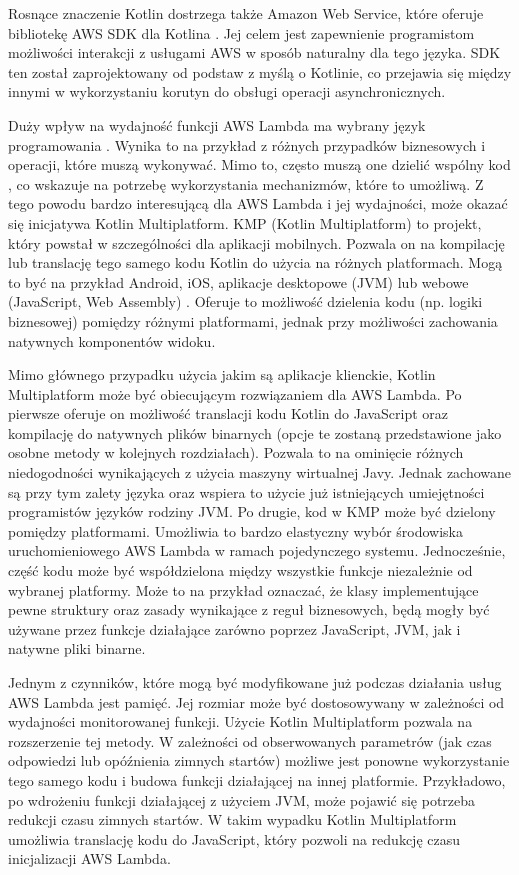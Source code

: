 Rosnące znaczenie Kotlin dostrzega także Amazon Web Service, które oferuje bibliotekę AWS SDK dla Kotlina \cite{awsSDKForKotlinDeveloperGuide}.
Jej celem jest zapewnienie programistom możliwości interakcji z usługami AWS w sposób naturalny dla tego języka.
SDK ten został zaprojektowany od podstaw z myślą o Kotlinie, co przejawia się między innymi w wykorzystaniu korutyn do obsługi operacji asynchronicznych.

Duży wpływ na wydajność funkcji AWS Lambda ma wybrany język programowania \cite{8605773}\cite{Cordingly2020704}.
Wynika to na przykład z różnych przypadków biznesowych i operacji, które muszą wykonywać.
Mimo to, często muszą one dzielić wspólny kod \cite{8116416}, co wskazuje na potrzebę wykorzystania mechanizmów, które to umożliwą.
Z tego powodu bardzo interesującą dla AWS Lambda i jej wydajności, może okazać się inicjatywa Kotlin Multiplatform.
KMP (Kotlin Multiplatform) to projekt, który powstał w szczególności dla aplikacji mobilnych.
Pozwala on na kompilację lub translację tego samego kodu Kotlin do użycia na różnych platformach.
Mogą to być na przykład Android, iOS, aplikacje desktopowe (JVM) lub webowe (JavaScript, Web Assembly) \cite{kotlinlangKotlinDocs}.
Oferuje to możliwość dzielenia kodu (np. logiki biznesowej) pomiędzy różnymi platformami, jednak przy możliwości zachowania natywnych komponentów widoku.

Mimo głównego przypadku użycia jakim są aplikacje klienckie, Kotlin Multiplatform może być obiecującym rozwiązaniem dla AWS Lambda.
Po pierwsze oferuje on możliwość translacji kodu Kotlin do JavaScript oraz kompilację do natywnych plików binarnych (opcje te zostaną przedstawione jako osobne metody w kolejnych rozdziałach).
Pozwala to na ominięcie różnych niedogodności wynikających z użycia maszyny wirtualnej Javy.
Jednak zachowane są przy tym zalety języka oraz wspiera to użycie już istniejących umiejętności programistów języków rodziny JVM.
Po drugie, kod w KMP może być dzielony pomiędzy platformami.
Umożliwia to bardzo elastyczny wybór środowiska uruchomieniowego AWS Lambda w ramach pojedynczego systemu.
Jednocześnie, część kodu może być współdzielona między wszystkie funkcje niezależnie od wybranej platformy.
Może to na przykład oznaczać, że klasy implementujące pewne struktury oraz zasady wynikające z reguł biznesowych, będą mogły być używane przez funkcje działające zarówno poprzez JavaScript, JVM, jak i natywne pliki binarne. 

Jednym z czynników, które mogą być modyfikowane już podczas działania usług AWS Lambda jest pamięć.
Jej rozmiar może być dostosowywany w zależności od wydajności monitorowanej funkcji.
Użycie Kotlin Multiplatform pozwala na rozszerzenie tej metody.
W zależności od obserwowanych parametrów (jak czas odpowiedzi lub opóźnienia zimnych startów) możliwe jest ponowne wykorzystanie tego samego kodu i budowa funkcji działającej na innej platformie.
Przykładowo, po wdrożeniu funkcji działającej z użyciem JVM, może pojawić się potrzeba redukcji czasu zimnych startów.
W takim wypadku Kotlin Multiplatform umożliwia translację kodu do JavaScript, który pozwoli na redukcję czasu inicjalizacji AWS Lambda.

